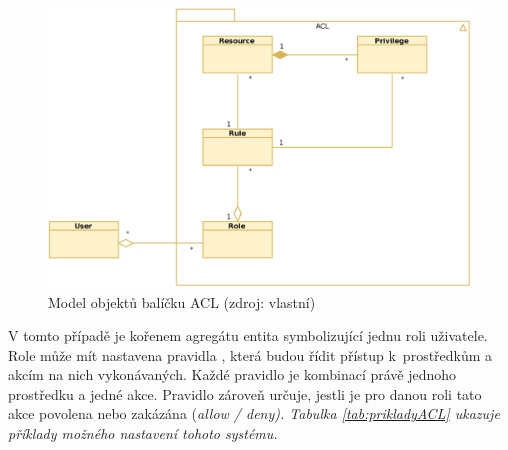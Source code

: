 \begin{figure}[h]
	\centering
	\includegraphics[width=\linewidth]{svg/ACLModelFull.eps}
	\captionsetup{width=\linewidth}
	\caption[Model objektů balíčku ACL]{Model objektů balíčku ACL (zdroj: vlastní)}
	\label{fig:AclModel}
\end{figure}
V tomto případě je kořenem agregátu entita  symbolizující jednu roli uživatele. Role může mít nastavena pravidla , která budou řídit přístup k~prostředkům  a akcím  na nich vykonávaných. Každé pravidlo je kombinací právě jednoho prostředku a jedné akce. Pravidlo zároveň určuje, jestli je pro danou roli tato akce povolena nebo zakázána (\it{allow / deny}). Tabulka \ref{tab:prikladyACL} ukazuje příklady možného nastavení tohoto systému.


\clearpage
